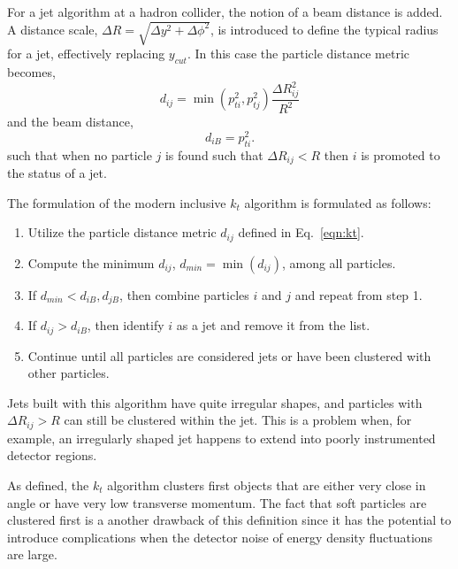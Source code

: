 For a jet algorithm at a hadron collider, the notion of a beam distance is added. %
A distance scale, $\Delta R = \sqrt{\Delta y^2 +\Delta \phi^2}$, is introduced to define the typical radius for a jet, effectively replacing $y_{cut}$. In this case the particle distance metric becomes, %
%
\begin{equation} 
d_{ij} = \min(p^2_{ti},p^2_{tj}) \frac{\Delta R^2_{ij}}{R^2}
\label{eqn:kt}
\end{equation}
%
and the beam distance, 
%
\begin{equation}
d_{iB}=p^2_{ti}. 
\end{equation}
%
such that when no particle $j$ is found such that $\Delta R_{ij} < R$ then $i$ is promoted to the status of a jet.  

The formulation of the modern inclusive $k_t$ algorithm is formulated as follows:

\begin{enumerate}\addtolength{\itemsep}{-0.4\baselineskip}
\item  
Utilize the particle distance metric $d_{ij}$ defined in Eq.~\ref{eqn:kt}.
\item
Compute the minimum $d_{ij}$, $d_{min} = \min(d_{ij})$, among all particles.
\item
If  $d_{min} < d_{iB},d_{jB}$, then combine particles $i$ and $j$ and repeat from step 1.
\item
If $d_{ij} > d_{iB}$, then identify $i$ as a jet and remove it from the list.
\item
Continue until all particles are considered jets or have been clustered with other particles.
\end{enumerate}

 Jets built with this algorithm have quite irregular shapes, and particles with $\Delta R_{ij} > R$ can still be clustered within the jet. This is a problem when, for example, an irregularly shaped jet happens to extend into poorly instrumented detector regions. 

As defined, the $k_t$ algorithm clusters first objects that are either very close in angle or have very low transverse momentum. The fact that soft particles are clustered first is a another drawback of this definition since it  has the potential to introduce complications when the detector noise of energy density fluctuations are large.

